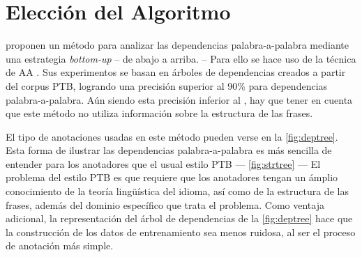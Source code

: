 \chapter{Elección del Algoritmo}
\label{ch:algorithm}

\citeauthor{yamada2003} \cite{yamada2003} proponen un método para analizar las
dependencias palabra-a-palabra mediante una estrategia \emph{bottom-up} -- de
abajo a arriba. -- Para ello se hace uso de la técnica de \ac{AA}
. Sus experimentos se basan en árboles de dependencias creados a
partir del corpus \ac{PTB}, logrando una precisión superior al 90\% para
dependencias palabra-a-palabra. Aún siendo esta precisión inferior al
, hay que tener en cuenta que este método no utiliza
información sobre la estructura de las frases.

El tipo de anotaciones usadas en este método pueden verse en la
\autoref{fig:deptree}. Esta forma de ilustrar las dependencias palabra-a-palabra
es más sencilla de entender para los anotadores que el usual estilo \ac{PTB} ---
\autoref{fig:strtree} --- El problema del estilo \ac{PTB} es que requiere que
los anotadores tengan un ámplio conocimiento de la teoría lingüística del
idioma, así como de la estructura de las frases, además del dominio específico
que trata el problema. Como ventaja adicional, la representación del árbol de
dependencias de la \autoref{fig:deptree} hace que la construcción de los datos
de entrenamiento sea menos ruidosa, al ser el proceso de anotación más simple.

